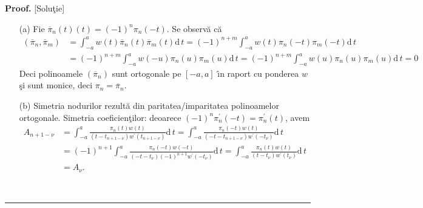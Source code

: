\documentclass{article}%
\newenvironment{proof}[1][Proof]{\noindent\textbf{#1.} }{\ \rule{0.5em}{0.5em}}
\begin{document}
\begin{proof}
[Solu\c{t}ie]

\begin{enumerate}
\item[(a)] Fie $\overline{\pi}_{n}(t)(t)=(-1)^{n}\pi_{n}(-t)$. Se observ\u{a}
c\u{a}%
\begin{align*}
\left(  \overline{\pi}_{n},\overline{\pi}_{m}\right)   &  =\int_{-a}%
^{a}w(t)\overline{\pi}_{n}(t)\overline{\pi}_{m}(t)\mathrm{d}\,t=(-1)^{n+m}%
\int_{-a}^{a}w(t)\pi_{n}(-t)\pi_{m}(-t)\mathrm{d}\,t\\
&  =(-1)^{n+m}\int_{-a}^{a}w(-u)\pi_{n}(u)\pi_{m}(u)\mathrm{d}\,t=(-1)^{n+m}%
\int_{-a}^{a}w(u)\pi_{n}(u)\pi_{m}(u)\mathrm{d}\,t=0
\end{align*}
Deci polinoamele $\left(  \overline{\pi}_{n}\right)  $ sunt ortogonale pe
$[-a,a]$ \^{\i}n raport cu ponderea $w$ \c{s}i sunt monice, deci $\pi
_{n}=\overline{\pi}_{n}$.

\item[(b)] Simetria nodurilor rezult\u{a} din paritatea/imparitatea
polinoamelor ortogonale. Simetria coeficien\c{t}ilor: deoarece $(-1)^{n}%
\pi_{n}^{\prime}(-t)=\pi_{n}^{\prime}(t)$, avem%
\begin{align*}
A_{n+1-\nu}  &  =\int_{-a}^{a}\frac{\pi_{n}(t)w(t)}{\left(  t-t_{n+1-\nu
}\right)  w^{\prime}(t_{n+1-\nu})}\mathrm{d}\,t=\int_{-a}^{a}\frac{\pi
_{n}(-t)w(t)}{\left(  -t-t_{n+1-\nu}\right)  w^{\prime}(-t_{\nu})}%
\mathrm{d}\,t\\
&  =\left(  -1\right)  ^{n+1}\int_{-a}^{a}\frac{\pi_{n}(-t)w(-t)}{\left(
-t-t_{\nu}\right)  \left(  -1\right)  ^{n+1}w^{\prime}(-t_{\nu})}%
\mathrm{d}\,t=\int_{-a}^{a}\frac{\pi_{n}(t)w(t)}{\left(  t-t_{\nu}\right)
w^{\prime}(t_{\nu})}\mathrm{d}\,t\\
&  =A_{\nu}.
\end{align*}



\end{enumerate}
\end{proof}
\end{document}
